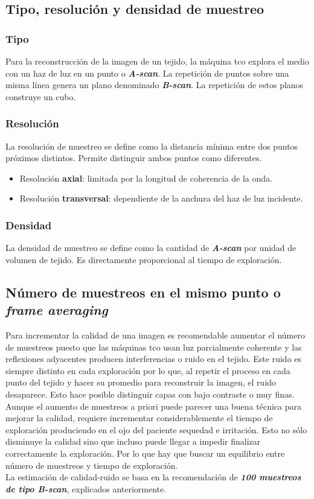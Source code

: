 \subsection{Tipo, resolución y densidad de muestreo}
\subsubsection{Tipo}
Para la reconstrucción de la imagen de un tejido, la máquina \gls{tco}
explora el medio con un haz de luz en un punto o
\emph{\textbf{A-scan}}. La repetición de puntos sobre una misma línea
genera un plano denominado \emph{\textbf{B-scan}}. La repetición de
estos planos construye un cubo.
\subsubsection{Resolución}
La resolución de muestreo se define como la distancia mínima entre dos
puntos próximos distintos. Permite distinguir ambos puntos como
diferentes.
\begin{itemize}
\item Resolución \textbf{axial}: limitada por la longitud de
  coherencia de la onda.
\item Resolución \textbf{transversal}: dependiente de la anchura del
  haz de luz incidente.
\end{itemize}
\subsubsection{Densidad}
La densidad de muestreo se define como la cantidad de
\emph{\textbf{A-scan}} por unidad de volumen de tejido. Es
directamente proporcional al tiempo de exploración.

\subsection{Número de muestreos en el mismo punto o \emph{frame
    averaging}}
Para incrementar la calidad de una imagen es recomendable aumentar el
número de muestreos puesto que las máquinas \gls{tco} usan luz
parcialmente coherente y las reflexiones adyacentes producen
interferencias o ruido en el tejido. Este ruido es siempre distinto en
cada exploración por lo que, al repetir el proceso en cada punto del
tejido y hacer su promedio para reconstruir la imagen, el ruido
desaparece. Esto hace posible distinguir capas con bajo contraste o
muy finas.\\
Aunque el aumento de muestreos a priori puede parecer una buena
técnica para mejorar la calidad, requiere incrementar
considerablemente el tiempo de exploración produciendo en el ojo del
paciente sequedad e irritación. Esto no sólo disminuye la calidad sino
que incluso puede llegar a impedir finalizar correctamente la
exploración. Por lo que hay que buscar un equilibrio entre número de
muestreos y tiempo de exploración.\\
La estimación de calidad-ruido se basa en la recomendación de
\emph{\textbf{100 muestreos de tipo B-scan}}, explicados
anteriormente.

